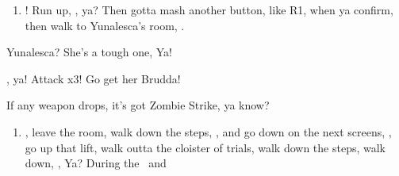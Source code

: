 \begin{enumerate}[resume]
\item \save! Run up, \sd, ya? Then gotta mash another button, like R1, when ya confirm, then walk to Yunalesca's room, \sd.
\end{enumerate}
\begin{battle}[132000]{Yunalesca? She's a tough one, Ya!}
\begin{itemize}
\summon{\bahamut}, ya!
\bahamutf Attack x3! Go get her Brudda!
\end{itemize}
If any weapon drops, it's got Zombie Strike, ya know?
\end{battle}
\begin{enumerate}[resume]
\item \sd, leave the room, walk down the steps, \sd, and go down on the next screens, \save, go up that lift, walk outta the cloister of trials, walk down the steps, walk down, \sd, Ya? During the \cs\ and \skippablefmv
\end{enumerate}